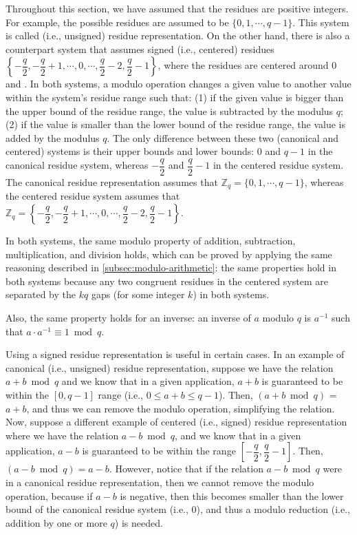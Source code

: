 Throughout this section, we have assumed that the residues are positive integers. For example, the possible residues  are assumed to be $\{0, 1, \cdots, q-1\}$. This system is called  (i.e., unsigned) residue representation. On the other hand, there is also a counterpart system that assumes signed (i.e., centered) residues $\left\{-\dfrac{q}{2}, -\dfrac{q}{2} + 1, \cdots, 0, \cdots, \dfrac{q}{2} - 2, \dfrac{q}{2} - 1\right\}$, where the residues are centered around $0$ and . In both systems, a modulo operation changes a given value to another value within the system's residue range such that: (1) if the given value is bigger than the upper bound of the residue range, the value is subtracted by the modulus $q$; (2) if the value is smaller than the lower bound of the residue range, the value is added by the modulus $q$. The only difference between these two (canonical and centered) systems is their upper bounds and lower bounds: $0$ and $q-1$ in the canonical residue system, whereas $-\dfrac{q}{2}$ and $\dfrac{q}{2} - 1$ in the centered residue system. The canonical residue representation assumes that $\mathbb{Z}_q = \{0, 1, \cdots, q-1\}$, whereas the centered residue system assumes that $\mathbb{Z}_q = \left\{-\dfrac{q}{2}, -\dfrac{q}{2} + 1, \cdots, 0, \cdots, \dfrac{q}{2} - 2, \dfrac{q}{2} - 1\right\}$. 

In both systems, the same modulo property of addition, subtraction, multiplication, and division holds, which can be proved by applying the same reasoning described in \autoref{subsec:modulo-arithmetic}: the same properties hold in both systems because any two congruent residues in the centered system are separated by the $kq$ gaps (for some integer $k$) in both systems. 

Also, the same property holds for an inverse: an inverse of $a$ modulo $q$ is $a^{-1}$ such that $a \cdot a^{-1} \equiv 1 \bmod q$. 

Using a signed residue representation is useful in certain cases. In an example of canonical (i.e., unsigned) residue representation, suppose we have the relation $a + b \bmod q$ and we know that in a given application, $a + b$ is guaranteed to be within the $[0, q-1]$ range (i.e., $0 \leq a + b \leq q-1$). Then, $(a + b \bmod q)$ = $a + b$, and thus we can remove the modulo operation, simplifying the relation. Now, suppose a different example of centered (i.e., signed) residue representation where we have the relation $a - b \bmod q$, and we know that in a given application, $a - b$ is guaranteed to be within the range $\left[-\dfrac{q}{2}, \dfrac{q}{2} - 1\right]$. Then, $(a - b \bmod q) = a - b$. However, notice that if the relation $a - b \bmod q$ were in a canonical residue representation, then we cannot remove the modulo operation, because if $a - b$ is negative, then this becomes smaller than the lower bound of the canonical residue system (i.e., $0$), and thus a modulo reduction (i.e., addition by one or more $q$) is needed. 

